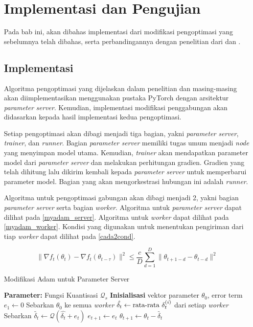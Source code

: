 \chapter{Implementasi dan Pengujian}

Pada bab ini, akan dibahas implementasi dari modifikasi pengoptimasi yang sebelumnya telah dibahas, serta perbandingannya dengan penelitian dari \textcite{Chen2022Efficient} dan \textcite{Chen2021CADA}.

\section{Implementasi}
Algoritma pengoptimasi yang dijelaskan dalam penelitian \textcite{Chen2022Efficient} dan \textcite{Chen2021CADA} masing-masing akan diimplementasikan menggunakan pustaka PyTorch dengan arsitektur \emph{parameter server}. Kemudian, implementasi modifikasi penggabungan akan didasarkan kepada hasil implementasi kedua pengoptimasi.

Setiap pengoptimasi akan dibagi menjadi tiga bagian, yakni \emph{parameter server}, \emph{trainer}, dan \emph{runner}. Bagian \emph{parameter server} memiliki tugas umum menjadi \emph{node} yang menyimpan model utama. Kemudian, \emph{trainer} akan mendapatkan parameter model dari \emph{parameter server} dan melakukan perhitungan gradien. Gradien yang telah dihitung lalu dikirim kembali kepada \emph{parameter server} untuk memperbarui parameter model. Bagian yang akan mengorkestrasi hubungan ini adalah \emph{runner}.

Algoritma untuk pengoptimasi gabungan akan dibagi menjadi 2, yakni bagian \textit{parameter server} serta bagian \textit{worker}. Algoritma untuk \textit{parameter server} dapat dilihat pada \autoref{myadam_server}. Algoritma untuk \textit{worker} dapat dilihat pada \autoref{myadam_worker}. Kondisi yang digunakan untuk menentukan pengiriman dari tiap \textit{worker} dapat dilihat pada \autoref{cada2cond}.

\begin{equation}
  \label{cada2cond}
  \|\nabla f_t(\theta_t) - \nabla f_t(\theta_{t-\tau})\|^2 \leq \frac{c}{D} \sum_{d=1}^{D} \|\theta_{t+1-d} - \theta_{t-d}\|^2
\end{equation}

\begin{algorithm}[H]
  \caption{Modifikasi Adam untuk Parameter Server}\label{myadam_server}
  \begin{algorithmic}[1]
    \State \textbf{Parameter:} Fungsi Kuantisasi $\mathcal{Q}_s$
    \State \textbf{Inisialisasi} vektor parameter $\theta_0$, error term $e_1 \gets 0$
    \State Sebarkan $\theta_0$ ke semua \textit{worker}
    \State $\hat{\delta_t} \gets \textnormal{rata-rata } \delta_t^{(i)}$ dari setiap \textit{worker}
    \State Sebarkan $\tilde{\delta_t} \gets \mathcal{Q}(\hat{\delta_t} + e_t)$
    \State $e_{t+1} \gets e_{t}$
    \State $\theta_{t+1} \gets \theta_t - \tilde{\delta_t}$
    \EndFor
  \end{algorithmic}
\end{algorithm}

